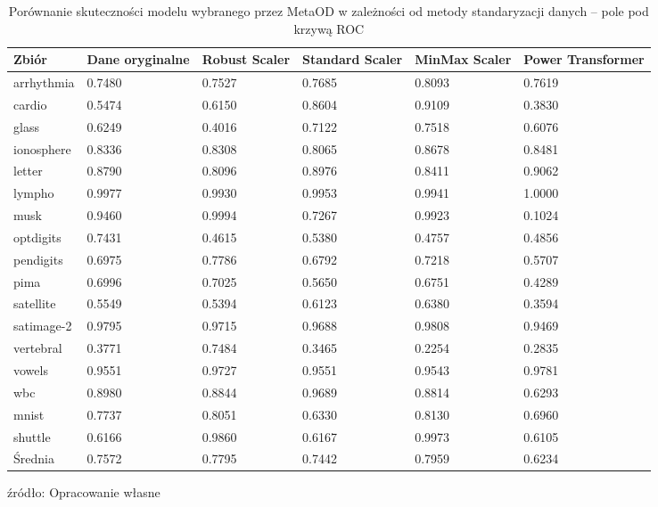 \begin{table}[]
    \centering
\begin{tabularx}{\textwidth}{lXXXXX}
      Zbiór & Dane oryginalne & Robust Scaler & Standard Scaler & MinMax Scaler & Power Transformer \\ \hline
arrhythmia &               0.7480 &                  0.7527 &            0.7685 &      0.8093 &      0.7619 \\
    cardio &               0.5474 &                  0.6150 &            0.8604 &      0.9109 &      0.3830 \\
     glass &               0.6249 &                  0.4016 &            0.7122 &      0.7518 &      0.6076 \\
ionosphere &               0.8336 &                  0.8308 &            0.8065 &      0.8678 &      0.8481 \\
    letter &               0.8790 &                  0.8096 &            0.8976 &      0.8411 &      0.9062 \\
    lympho &               0.9977 &                  0.9930 &            0.9953 &      0.9941 &      1.0000 \\
      musk &               0.9460 &                  0.9994 &            0.7267 &      0.9923 &      0.1024 \\
 optdigits &               0.7431 &                  0.4615 &            0.5380 &      0.4757 &      0.4856 \\
 pendigits &               0.6975 &                  0.7786 &            0.6792 &      0.7218 &      0.5707 \\
      pima &               0.6996 &                  0.7025 &            0.5650 &      0.6751 &      0.4289 \\
 satellite &               0.5549 &                  0.5394 &            0.6123 &      0.6380 &      0.3594 \\
satimage-2 &               0.9795 &                  0.9715 &            0.9688 &      0.9808 &      0.9469 \\
 vertebral &               0.3771 &                  0.7484 &            0.3465 &      0.2254 &      0.2835 \\
    vowels &               0.9551 &                  0.9727 &            0.9551 &      0.9543 &      0.9781 \\
       wbc &               0.8980 &                  0.8844 &            0.9689 &      0.8814 &      0.6293 \\
     mnist &               0.7737 &                  0.8051 &            0.6330 &      0.8130 &      0.6960 \\
   shuttle &               0.6166 &                  0.9860 &            0.6167 &      0.9973 &      0.6105 \\
\hline
Średnia &0.7572&
0.7795&
0.7442&
0.7959&
0.6234
\end{tabularx}
\caption{Porównanie skuteczności modelu wybranego przez MetaOD w zależności od metody standaryzacji danych -- pole pod krzywą ROC}
\footnotesize{źródło: Opracowanie własne}
\label{tab:roc_sc}
\end{table}
